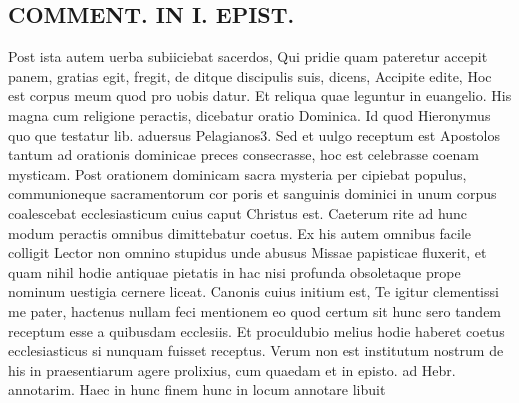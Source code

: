 \documentclass{article}
\begin{document}
\begin{pages}
\section*{COMMENT. IN I. EPIST. }\pstart Post ista autem uerba subiiciebat sacerdos, Qui pridie quam pateretur accepit panem, gratias egit, fregit, de ditque discipulis suis, dicens, Accipite edite, Hoc est corpus meum quod pro uobis datur. Et reliqua quae leguntur in euangelio. His magna cum religione peractis, dicebatur oratio Dominica. Id quod Hieronymus quo que testatur lib. aduersus Pelagianos3. Sed et uulgo receptum est Apostolos tantum ad orationis dominicae preces consecrasse, hoc est celebrasse coenam mysticam. Post orationem dominicam sacra mysteria per cipiebat populus, communioneque sacramentorum cor poris et sanguinis dominici in unum corpus coalescebat ecclesiasticum cuius caput Christus est. Caeterum rite ad hunc modum peractis omnibus dimittebatur coetus. Ex his autem omnibus facile colligit Lector non omnino stupidus unde abusus Missae papisticae fluxerit, et quam nihil hodie antiquae pietatis in hac nisi profunda obsoletaque prope nominum uestigia cernere liceat. Canonis cuius initium est, Te igitur clementissi me pater, hactenus nullam feci mentionem eo quod certum sit hunc sero tandem receptum esse a quibusdam ecclesiis. Et proculdubio melius hodie haberet coetus ecclesiasticus si nunquam fuisset receptus. Verum non est institutum nostrum de his in praesentiarum agere prolixius, cum quaedam et in episto. ad Hebr. annotarim. Haec in hunc finem hunc in locum annotare libuit  \pend

\end{pages}
\end{document}
